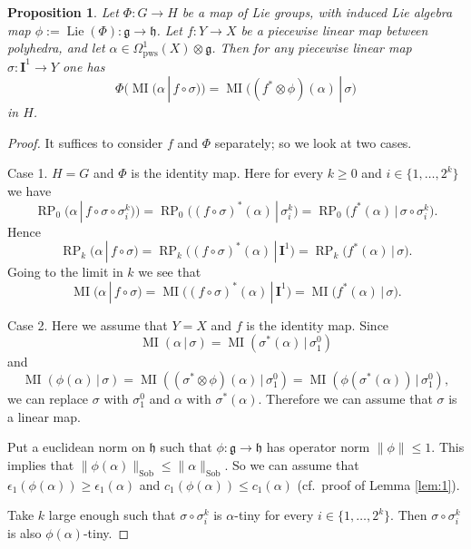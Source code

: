 \documentclass[10pt, a4paper]{amsart}
\newtheorem{prop}[equation]{Proposition}
\theoremstyle{definition}
\numberwithin{equation}{section}
\newcommand{\opn}{\operatorname}
\newcommand{\mfrak}[1]{\mathfrak{#1}}
\newcommand{\mbf}[1]{\mathbf{#1}}
\newcommand{\mrm}[1]{\mathrm{#1}}
\newcommand{\norm}[1]{\lVert #1 \rVert}
\renewcommand{\vert}{\, | \,}
\newcommand{\g}{\mfrak{g}}
\newcommand{\h}{\mfrak{h}}
\begin{document}
\begin{prop}  \label{prop:6}
Let $\Phi : G \to H$ be a map of Lie groups, with induced Lie algebra map
$\phi := \opn{Lie}(\Phi) : \g \to \h$. Let $f : Y \to X$ be a piecewise linear
map between polyhedra, and let
$\alpha \in \Omega^1_{\mrm{pws}}(X) \otimes \g$.
Then for any piecewise linear map $\sigma : \mbf{I}^{1} \to Y$ one has
\[ \Phi \bigl( \opn{MI}(\alpha \vert f \circ \sigma) \bigr) = 
\opn{MI} \bigl( (f^* \otimes \phi)(\alpha) \vert \sigma \bigr) \]
in $H$.
\end{prop}

\begin{proof}
It suffices to consider $f$ and $\Phi$ separately; so we look at two cases.

\medskip \noindent
Case 1. $H = G$ and $\Phi$ is the identity map. Here for every $k \geq 0$
and $i \in \{ 1, \ldots, 2^k \}$ we have
\[ \opn{RP}_{0}(\alpha \vert f \circ \sigma \circ \sigma^k_i) 
\bigr) =
\opn{RP}_{0} \bigl( (f \circ \sigma)^*(\alpha) \vert \sigma^k_i \bigr) =
\opn{RP}_{0} \bigl( f^*(\alpha) \vert \sigma \circ \sigma^k_i \bigr) . \]
Hence
\[ \opn{RP}_{k}(\alpha \vert f \circ \sigma) =
\opn{RP}_{k} \bigl( (f \circ \sigma)^*(\alpha)  \vert \mbf{I}^{1} \bigr) =
\opn{RP}_{k} \bigl( f^*(\alpha) \vert \sigma \bigr) . \]
Going to the limit in $k$ we see that 
\[ \opn{MI}(\alpha \vert f \circ \sigma) =
\opn{MI} \bigl( (f \circ \sigma)^*(\alpha)  \vert \mbf{I}^{1} \bigr) =
\opn{MI} \bigl( f^*(\alpha) \vert \sigma \bigr) . \]


\medskip \noindent
Case 2. 
Here we assume that $Y = X$ and $f$ is the identity map. 
Since 
\[ \opn{MI}(\alpha \vert \sigma) = \opn{MI}(\sigma^*(\alpha) \vert \sigma^0_1)
\]
and 
\[ \opn{MI}(\phi(\alpha) \vert \sigma) = 
\opn{MI}((\sigma^* \otimes \phi)(\alpha) \vert \sigma^0_1) =
\opn{MI}(\phi(\sigma^*(\alpha)) \vert \sigma^0_1) , \]
we can replace $\sigma$ with $\sigma^0_1$ and $\alpha$ with
$\sigma^*(\alpha)$. Therefore we can assume that $\sigma$ is a linear map. 

Put a euclidean norm on $\h$ such that $\phi : \g \to \h$ has operator norm 
$\norm{\phi} \leq 1$. 
This implies that 
$\norm{ \phi(\alpha) }_{\mrm{Sob}} \leq \norm{\alpha}_{\mrm{Sob}}$.
So we can assume that
$\epsilon_1(\phi(\alpha)) \geq \epsilon_1(\alpha)$
and
$c_1(\phi(\alpha)) \leq c_1(\alpha)$
(cf.\ proof of Lemma \ref{lem:1}).

Take $k$ large enough such that 
$\sigma \circ \sigma^k_i$ is $\alpha$-tiny for every 
$i \in \{ 1, \ldots, 2^k \}$.
Then $\sigma \circ \sigma^k_i$ is also $\phi(\alpha)$-tiny.


\end{proof}
\end{document}
